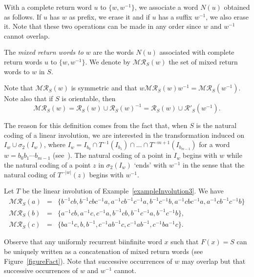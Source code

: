 \documentclass[preprint,12pt]{elsarticle}
\newcommand\RR{\mathcal{R}}
\newcommand\MR{\mathcal{MR}}
\numberwithin{theorem}{section}
\numberwithin{equation}{section}
\numberwithin{figure}{section}
\numberwithin{table}{section}
\begin{document}
With a complete return word $u$ to $\{w,w^{-1}\}$, we associate a word $N(u)$ obtained as follows. If $u$ has  $w$ as prefix, we erase it
and if $u$ has a suffix $w^{-1}$, we also erase it. Note that these two operations can be made in any order since
$w$ and $w^{-1}$ cannot overlap.

The \emph{mixed  return words to $w$} are the words $N(u)$ associated with complete return words $u$ to $\{w,w^{-1}\}$. We denote by $\MR_S(w)$ the set
of  mixed return words to $w$ in $S$.

Note that $\MR_S(w)$ is symmetric and that $w\MR_S(w)w^{-1}=\MR_S(w^{-1})$. Note
also that if $S$ is orientable, then
\begin{displaymath}
\MR_S(w)=\RR_S(w)\cup \RR_S(w)^{-1}=\RR_S(w)\cup \RR'_S(w^{-1}).
\end{displaymath}

The reason for this definition comes from the fact that, when $S$ is the natural coding of a linear involution, we are interested in the transformation induced on $I_w\cup\sigma_2(I_w)$,
where $I_w=I_{b_0}\cap T^{-1}(I_{b_1})\cap\ldots\cap T^{-m+1}(I_{b_{m-1}})$ for a word $w=b_0b_1\cdots b_{m-1}$ (see~\cite{BertheDelecroixDolcePerrinReutenauerRindone2014}).
The natural coding of a point in $I_w$ begins with $w$ while the natural coding of a point $z$ in $\sigma_2(I_w)$ `ends' with $w^{-1}$ in the sense that the natural coding of  $T^{-|w|}(z)$  begins with $w^{-1}$.

\begin{example}
\label{exampleMixedReturn}
Let $T$ be the linear involution of Example~\ref{exampleInvolution3}.
We have 
\begin{eqnarray*}
\MR_S(a)&=&\{b^{-1}cb,b^{-1}cbc^{-1}a,a^{-1}cb^{-1}c^{-1}a
,b^{-1}c^{-1}b,a^{-1}cbc^{-1}a,a^{-1}cb^{-1}c^{-1}b\}\\
\MR_S(b)&=&\{a^{-1}cb,a^{-1}c,c^{-1}a,b^{-1}cb,
b^{-1}c^{-1}a,b^{-1}c^{-1}b\},\\
\MR_S(c)&=&\{ba^{-1}c,b,b^{-1},c^{-1}ab^{-1}c,
c^{-1}ab^{-1},c^{-1}ba^{-1}c\}.
\end{eqnarray*}
\end{example}

Observe that any uniformly recurrent biinfinite word $x$ such that $F(x)=S$ can be uniquely written as a concatenation of  mixed return words (see Figure~\ref{figureFact}).
Note that successive occurrences of $w$ may overlap but that successive occurrences of $w$ and $w^{-1}$ cannot.
\end{document}
